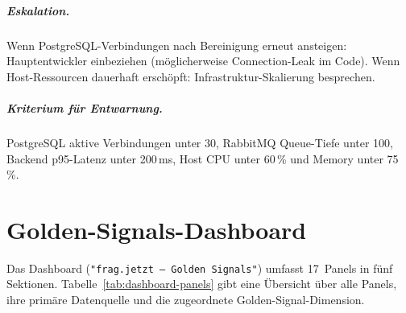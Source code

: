 \paragraph{Eskalation.}
Wenn PostgreSQL-Verbindungen nach Bereinigung erneut ansteigen: Hauptentwickler einbeziehen (möglicherweise Connection-Leak im Code). Wenn Host-Ressourcen dauerhaft erschöpft: Infrastruktur-Skalierung besprechen.

\paragraph{Kriterium für Entwarnung.}
PostgreSQL aktive Verbindungen unter 30, RabbitMQ Queue-Tiefe unter 100, Backend p95-Latenz unter 200\,ms, Host CPU unter 60\,\% und Memory unter 75\,\%.


\chapter{Golden-Signals-Dashboard}
\label{app:dashboard}

Das Dashboard (\texttt{"frag.jetzt -- Golden Signals"}) umfasst 17~Panels in fünf Sektionen. Tabelle~\ref{tab:dashboard-panels} gibt eine Übersicht über alle Panels, ihre primäre Datenquelle und die zugeordnete Golden-Signal-Dimension.

